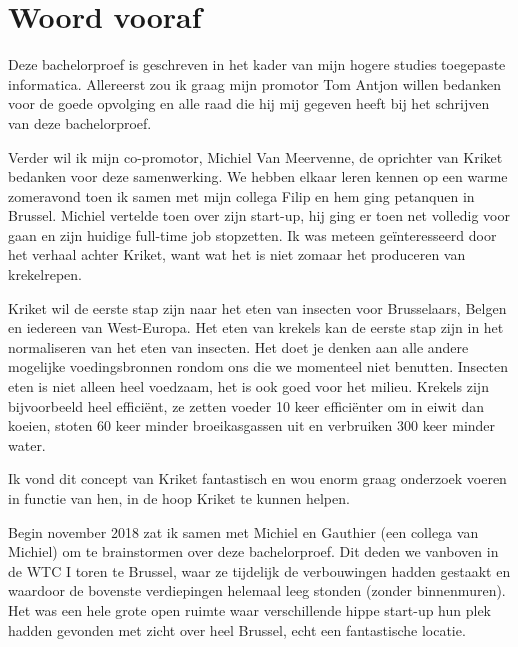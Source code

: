 
\chapter*{Woord vooraf}
\label{ch:voorwoord}

Deze bachelorproef is geschreven in het kader van mijn hogere studies toegepaste informatica. Allereerst zou ik graag mijn promotor Tom Antjon willen bedanken voor de goede opvolging en alle raad die hij mij gegeven heeft bij het schrijven van deze bachelorproef. 

Verder wil ik mijn co-promotor, Michiel Van Meervenne, de oprichter van Kriket bedanken voor deze samenwerking. We hebben elkaar leren kennen op een warme zomeravond toen ik samen met mijn collega Filip en hem ging petanquen in Brussel. Michiel vertelde toen over zijn start-up, hij ging er toen net volledig voor gaan en zijn huidige full-time job stopzetten. Ik was meteen geïnteresseerd door het verhaal achter Kriket, want wat het is niet zomaar het produceren van krekelrepen. 

Kriket wil de eerste stap zijn naar het eten van insecten voor Brusselaars, Belgen en iedereen van West-Europa. Het eten van krekels kan de eerste stap zijn in het normaliseren van het eten van insecten. Het doet je denken aan alle andere mogelijke voedingsbronnen rondom ons die we momenteel niet benutten. Insecten eten is niet alleen heel voedzaam, het is ook goed voor het milieu. Krekels zijn bijvoorbeeld heel efficiënt, ze zetten voeder 10 keer efficiënter om in eiwit dan koeien, stoten 60 keer minder broeikasgassen uit en verbruiken 300 keer minder water. \autocite{Kriket2018}

Ik vond dit concept van Kriket fantastisch en wou enorm graag onderzoek voeren in functie van hen, in de hoop Kriket te kunnen helpen. 

Begin november 2018 zat ik samen met Michiel en Gauthier (een collega van Michiel) om te brainstormen over deze bachelorproef. Dit deden we vanboven in de WTC I toren te Brussel, waar ze tijdelijk de verbouwingen hadden gestaakt en waardoor de bovenste verdiepingen helemaal leeg stonden (zonder binnenmuren). Het was een hele grote open ruimte waar verschillende hippe start-up hun plek hadden gevonden met zicht over heel Brussel, echt een fantastische locatie.

